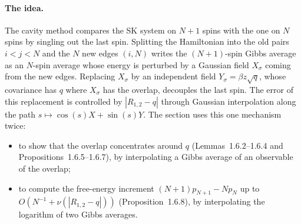 \paragraph{The idea.}
The cavity method compares the SK system on $N+1$ spins with the one on $N$ spins by singling
out the last spin.  Splitting the Hamiltonian into the old pairs $i<j<N$ and the $N$ new edges
$(i,N)$ writes the $(N+1)$-spin Gibbs average as an $N$-spin average whose energy is perturbed
by a Gaussian field $X_\sigma$ coming from the new edges.  Replacing $X_\sigma$ by an independent
field $Y_\sigma=\beta z\sqrt q$, whose covariance has $q$ where $X_\sigma$ has the overlap,
decouples the last spin.  The error of this replacement is controlled by $|R_{1,2}-q|$ through
Gaussian interpolation along the path $s\mapsto\cos(s)X+\sin(s)Y$.
The section uses this one mechanism twice:
\begin{itemize}
\item to show that the overlap concentrates around $q$ (Lemmas~1.6.2--1.6.4 and
  Propositions~1.6.5--1.6.7), by interpolating a Gibbs average of an observable of the overlap;
\item to compute the free-energy increment $(N+1)p_{N+1}-Np_N$ up to $O(N^{-1}+\nu(|R_{1,2}-q|))$
  (Proposition~1.6.8), by interpolating the logarithm of two Gibbs averages.
\end{itemize}


